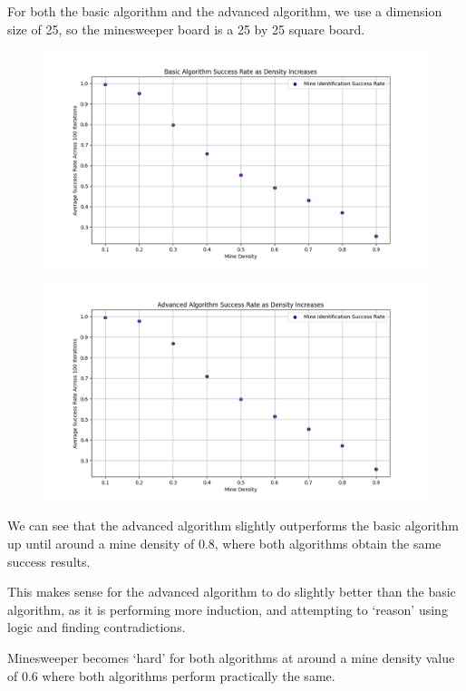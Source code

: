 \documentclass[12pt, twoside]{article}
\begin{document}
\begin{enumerate}[itemsep=2mm,parsep=4mm]
        For both the basic algorithm and the advanced algorithm, we use a dimension size of 25, so the minesweeper board is a 25 by 25 square board.

        \begin{figure}[H]
            \centering
            \includegraphics[scale = 0.5]{Basic Algorithm.png}
        \end{figure}
        \begin{figure}[H]
            \centering
            \includegraphics[scale = 0.5]{Advanced Algorithm.png}
        \end{figure}

        We can see that the advanced algorithm slightly outperforms the basic algorithm up until around a mine density of 0.8, where both algorithms obtain the same success results.

        This makes sense for the advanced algorithm to do slightly better than the basic algorithm, as it is performing more induction, and attempting to `reason' using logic and finding contradictions.

        Minesweeper becomes `hard' for both algorithms at around a mine density value of $0.6$ where both algorithms perform practically the same.


\end{enumerate}
\end{document}

